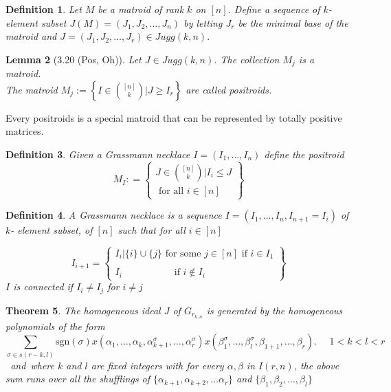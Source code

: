 \documentclass[12pt]{report}
\theoremstyle{theorem}
\newtheorem{theorem}{Theorem}
\newtheorem{definition}[theorem]{Definition}
\newtheorem{lemma}[theorem]{Lemma}
\begin{document}
\begin{definition}
\normalfont Let $M$ be a matroid of rank $k$ on $[n]$. Define a sequence of $k$- element subset $J(M) = (J_1,J_2,\ldots,J_n)$ by letting $J_r$ be the minimal base of the matroid and $J = (J_1, J_2, \ldots, J_r)\in Jugg(k,n).$
\end{definition}
\begin{lemma}[3.20 (Pos, Oh)] Let $J\in Jugg(k,n)$. The collection $M_j$ is a matroid.\\
The matroid $M_j:=\left\{I\in \binom{[n]}{k}|J\geq I_r\right\}$ are called positroids.
\end{lemma}
Every positroids is a special matroid that can be represented by totally positive matrices.
\begin{definition}
\normalfont Given a Grassmann necklace $I = (I_1,\ldots,I_n)$ define the positroid
\begin{equation*}
M_I: = \left\{
\begin{split}
J\in \binom{[n]}{k}|I_i\leq J\\
\mbox{ for all } i\in [n]
\end{split}
\right\}
\end{equation*}
\end{definition}
\begin{definition}
\normalfont A Grassmann necklace is a sequence $I = (I_1,\ldots,I_n,I_{n+1} = I_i)$ of $k$- element subset, of $[n]$ such that for all $i\in[n]$

\begin{equation*}
I_{i+1} = \left\{
\begin{split}
I_i|\{i\}\cup\{j\} \mbox{  for some } j \in [n] \mbox{ if } i\in I_1\\\\
I_i~~~~~~~~~~~~~~~~~~~~~~~\mbox{  if  } i\notin I_i
\end{split}
\right\}
\end{equation*}
$I$ is connected if $I_i\neq I_j$ for $i\neq j$
\end{definition}
\begin{theorem}
The homogeneous ideal $J$ of $G_{r_{k,n}}$ is generated by the homogeneous polynomials of the form
\begin{equation}
\sum_{\sigma\in s(r-k,l)}\mbox{sgn} (\sigma)x(\alpha_1,\ldots,\alpha_k,\alpha_{k+1}^{\sigma},\ldots,\alpha_r^\sigma)x(\beta_1^\sigma,\ldots,\beta_l^\sigma,\beta_{1+1},\ldots,\beta_r).~~~~~~1<k<l<r 
\end{equation}
\mbox{  and  }where $k$ and $l$ are fixed integers with for every $\alpha,\beta$ in $I(r,n)$, the above sum runs over all the shufflings of $\{\alpha_{k+1},\alpha_{k+2},\ldots\alpha_r\}$ and $\{\beta_{1},\beta_{2},\ldots,\beta_{l}\}$
\end{theorem}
\end{document}
